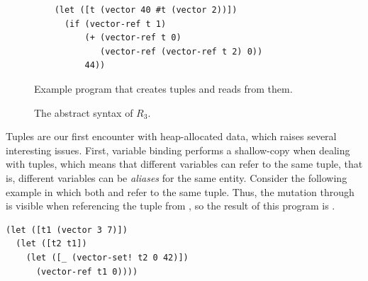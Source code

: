 \documentclass[11pt]{book}
\newcommand{\gray}[1]{{\color{gray} #1}}
\begin{document}
\begin{figure}[tbp]
\begin{lstlisting}
    (let ([t (vector 40 #t (vector 2))])
      (if (vector-ref t 1)
          (+ (vector-ref t 0)
             (vector-ref (vector-ref t 2) 0))
          44))
\end{lstlisting}
\caption{Example program that creates tuples and reads from them.}
\label{fig:vector-eg}
\end{figure}

\begin{figure}[tp]
\centering
\fbox{
\begin{minipage}{0.96\textwidth}
\[
\begin{array}{lcl}
  \itm{op} &::=& \ldots
   \mid \code{vector} \mid \code{vector-ref} \mid \code{vector-set!}
   \mid \code{vector-length} \\
\Exp &::=& \gray{ \INT{\Int} \mid \VAR{\Var} \mid \LET{\Var}{\Exp}{\Exp} } \\
     &\mid& \gray{ \PRIM{\itm{op}}{\Exp\ldots}
      \mid \BOOL{\itm{bool}}
      \mid \IF{\Exp}{\Exp}{\Exp} } \\
     &\mid& \VOID{} \mid \LP\key{HasType}~\Exp~\Type \RP \\
  R_3 &::=& \PROGRAM{\key{'()}}{\Exp}
\end{array}
\]
\end{minipage}
}
\caption{The abstract syntax of $R_3$.}
\label{fig:r3-syntax}
\end{figure}

Tuples are our first encounter with heap-allocated data, which raises
several interesting issues. First, variable binding performs a
shallow-copy when dealing with tuples, which means that different
variables can refer to the same tuple, that is, different variables
can be \emph{aliases} for the same entity. Consider the following
example in which both  and  refer to the same tuple.
Thus, the mutation through  is visible when referencing the
tuple from , so the result of this program is .
\begin{center}
\begin{minipage}{0.96\textwidth}
\begin{lstlisting}
(let ([t1 (vector 3 7)])
  (let ([t2 t1])
    (let ([_ (vector-set! t2 0 42)])
      (vector-ref t1 0))))
\end{lstlisting}
\end{minipage}
\end{center}
\end{document}
